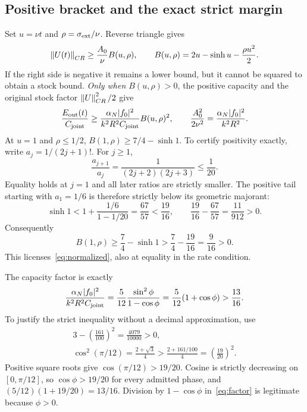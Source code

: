\subsection{Positive bracket and the exact strict margin}
Set $u=\nu t$ and $\rho=\sigma_{\rm ext}/\nu$. Reverse triangle gives
\begin{equation}\label{eq:bracket}%
\norm{U(t)}_{CR}\ge\frac{A_0}{\nu}B(u,\rho),\qquad
B(u,\rho)=2u-\sinh u-\frac{\rho u^2}{2}.
\end{equation}
If the right side is negative it remains a lower bound, but it cannot be squared to obtain a stock bound. \emph{Only when $B(u,\rho)>0$}, the positive capacity and the original stock factor $\left\|U\right\|_{CR}^2/2$ give
\begin{equation}\label{eq:normalized}%
\frac{E_{\rm out}(t)}{C_{\rm joint}}
\ge\frac{\alpha_N|f_0|^2}{k^2R^2C_{\rm joint}}B(u,\rho)^2,\qquad
\frac{A_0^2}{2\nu^2}=\frac{\alpha_N|f_0|^2}{k^2R^2}.
\end{equation}
At $u=1$ and $\rho\le1/2$, $B(1,\rho)\ge7/4-\sinh1$. To certify positivity exactly, write $a_j=1/(2j+1)!$. For $j\ge1$,
\begin{equation}\label{eq:tailratio}%
\frac{a_{j+1}}{a_j}=\frac1{(2j+2)(2j+3)}\le\frac1{20}.
\end{equation}
Equality holds at $j=1$ and all later ratios are strictly smaller. The positive tail starting with $a_1=1/6$ is therefore strictly below its geometric majorant:
\begin{equation}\label{eq:sinh}%
\sinh1<1+\frac{1/6}{1-1/20}=\frac{67}{57}<\frac{19}{16},
\qquad \frac{19}{16}-\frac{67}{57}=\frac{11}{912}>0.
\end{equation}
Consequently
\begin{equation}\label{eq:positive}%
B(1,\rho)\ge\frac74-\sinh1>
\frac74-\frac{19}{16}=\frac9{16}>0.
\end{equation}
This licenses~\eqref{eq:normalized}, also at equality in the rate condition.

The capacity factor is exactly
\begin{equation}\label{eq:factor}%
\frac{\alpha_N|f_0|^2}{k^2R^2C_{\rm joint}}
=\frac5{12}\frac{\sin^2\phi}{1-\cos\phi}
=\frac5{12}(1+\cos\phi)>\frac{13}{16}.
\end{equation}
To justify the strict inequality without a decimal approximation, use
\begin{equation}\label{eq:cosine}%
\begin{gathered}
3-\left(\frac{161}{100}\right)^2=\frac{4079}{10000}>0,\\
\cos^2(\pi/12)=\frac{2+\sqrt3}{4}>
\frac{2+161/100}{4}=\left(\frac{19}{20}\right)^2.
\end{gathered}
\end{equation}
Positive square roots give $\cos(\pi/12)>19/20$. Cosine is strictly decreasing on $[0,\pi/12]$, so $\cos\phi>19/20$ for every admitted phase, and $(5/12)(1+19/20)=13/16$. Division by $1-\cos\phi$ in~\eqref{eq:factor} is legitimate because $\phi>0$.

